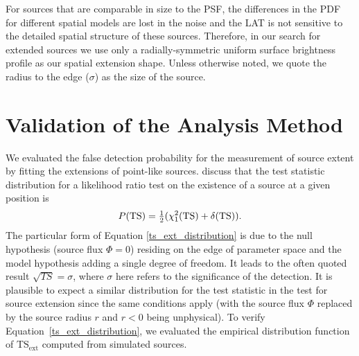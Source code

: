 \documentclass[12pt,preprint]{aastex}
\newcommand{\tsext}{{\ensuremath{\text{TS}_{\text{ext}}}}\xspace}
\newcommand{\ts}{\text{TS}\xspace}
\begin{document}
For sources that are comparable in size to the PSF,
the differences in the PDF for
different spatial models are lost in the noise and the LAT is not sensitive
to the detailed spatial structure of these sources.  Therefore, in our
search for extended sources we use only a radially-symmetric uniform
surface brightness profile as our spatial extension shape. Unless otherwise noted,
we quote the radius to the edge ($\sigma$) as the size of the source.

\section{Validation of the Analysis Method}
\label{monte_carlo_validation}

We evaluated the false detection probability for the measurement of source extent
by fitting the extensions of point-like sources.  \cite{mattox_egret}
discuss that the test statistic distribution for a likelihood ratio test
on the existence of a source at a given position is
\begin{equation}\label{ts_ext_distribution}
  P(\ts)=\onehalf(\chi^2_1(\ts)+\delta(\ts)).
\end{equation}
The particular form of Equation \ref{ts_ext_distribution} is due to the
null hypothesis (source flux $\Phi=0$) residing on the edge of parameter
space and the model hypothesis adding a single degree of freedom.
It leads to the often quoted result $\sqrt{TS}=\sigma$, where 
$\sigma$ here refers to the significance of the detection. It is plausible
to expect a similar distribution for the test statistic in the test for
source extension since the same conditions apply (with the source flux
$\Phi$ replaced by the source radius $r$ and $r<0$ being unphysical).
To verify Equation~\ref{ts_ext_distribution}, we evaluated the
empirical distribution function of \tsext computed from simulated sources.
\end{document}
